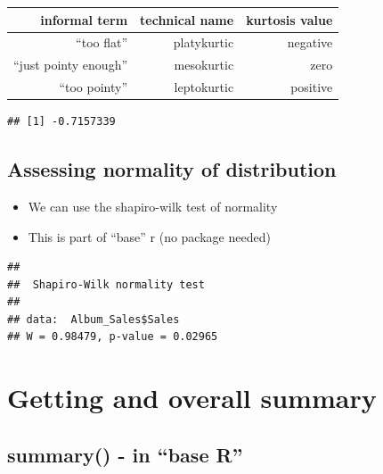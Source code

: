 \documentclass[
]{book}
\newenvironment{Shaded}{\begin{snugshade}}{\end{snugshade}}
\newcommand{\KeywordTok}[1]{\textcolor[rgb]{0.13,0.29,0.53}{\textbf{#1}}}
\newcommand{\NormalTok}[1]{#1}
\newcommand{\OperatorTok}[1]{\textcolor[rgb]{0.81,0.36,0.00}{\textbf{#1}}}
\providecommand{\tightlist}{%
  \setlength{\itemsep}{0pt}\setlength{\parskip}{0pt}}
\begin{document}
\begin{longtable}[]{@{}rrr@{}}
\toprule
informal term & technical name & kurtosis value\tabularnewline
\midrule
\endhead
``too flat'' & platykurtic & negative\tabularnewline
``just pointy enough'' & mesokurtic & zero\tabularnewline
``too pointy'' & leptokurtic & positive\tabularnewline
\bottomrule
\end{longtable}

\begin{Shaded}
\end{Shaded}

\begin{verbatim}
## [1] -0.7157339
\end{verbatim}

\hypertarget{assessing-normality-of-distribution}{%
\subsection{Assessing normality of distribution}\label{assessing-normality-of-distribution}}

\begin{itemize}
\tightlist
\item
  We can use the shapiro-wilk test of normality
\item
  This is part of ``base'' r (no package needed)
\end{itemize}

\begin{Shaded}
\end{Shaded}

\begin{verbatim}
## 
##  Shapiro-Wilk normality test
## 
## data:  Album_Sales$Sales
## W = 0.98479, p-value = 0.02965
\end{verbatim}

\hypertarget{getting-and-overall-summary}{%
\section{Getting and overall summary}\label{getting-and-overall-summary}}

\hypertarget{summary---in-base-r}{%
\subsection{summary() - in ``base R''}\label{summary---in-base-r}}
\end{document}
